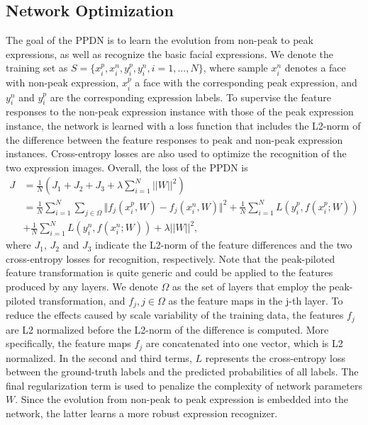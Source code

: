\documentclass[runningheads]{llncs}
\begin{document}
\subsection{Network Optimization}

The goal of the PPDN is to learn the evolution from non-peak 
to peak expressions, as well as recognize the basic facial expressions. 
We denote the training set as 
$S =  \lbrace x^{p}_{i},x^n_{i},y^p_{i},y^n_i,i = 1,...,N \rbrace$, where 
sample $x^n_{i}$ denotes a face with non-peak expression, $x^p_{i}$ a
face with the corresponding peak expression, and $y^n_{i}$ and $y^p_{i}$ are 
the corresponding expression labels. To supervise the feature responses
to the non-peak expression instance with those of the peak expression instance, 
the network is learned with a loss function that includes the L2-norm 
of the difference between the feature responses to peak and non-peak 
expression instances. Cross-entropy losses are also used to optimize the 
recognition of the two expression images. Overall, the loss of the PPDN is
\begin{equation}\begin{aligned} J &= \frac{1}{N}(J_1 + J_2 +J_3 + \lambda \sum_{i=1}^N||W||^2) \\
& = \frac{1}{N}\sum_{i=1}^N \sum_{j \in \Omega}\Vert f_j(x^p_{i},W) - f_j(x^n_{i},W) \Vert^2  +  \frac{1}{N}\sum_{i=1}^N L(y^p_i,f(x^p_i;W)) \\
&+ \frac{1}{N}\sum_{i=1}^N L(y^n_i,f(x^n_i;W))+ \lambda||W||^2,
\end{aligned}
\label{eq:loss}
 \end{equation}
where $J_1$, $J_2$ and $J_3$ indicate the L2-norm of the feature differences 
and the two cross-entropy losses for recognition, respectively. Note that the 
peak-piloted feature transformation is quite generic and could be applied to 
the features produced by any layers. We denote $\Omega$ as the set of layers 
that employ the peak-piloted transformation, and $f_j, j \in \Omega$ as the 
feature maps in the j-th layer. To reduce the effects caused by scale 
variability of the training data, the features $f_j$  are L2 normalized
before the L2-norm of the difference is computed. More specifically, the 
feature maps $f_j$ are concatenated into one vector, which is L2 normalized. 
In the second and third terms, $L$ represents the cross-entropy loss 
between the ground-truth labels and the predicted probabilities of all 
labels. The final regularization term is used to penalize the complexity of 
network parameters $W$. Since the evolution from non-peak to 
peak expression is embedded into the network, the latter learns a more 
robust expression recognizer. 
 
\end{document}
